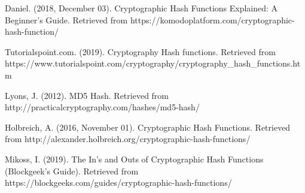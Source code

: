 \documentclass{article}
\begin{document}
\begin{thebibliography}{}
	Daniel. (2018, December 03). Cryptographic Hash Functions Explained: A Beginner's Guide. Retrieved from {https://komodoplatform.com/cryptographic-hash-function/}
	
	Tutorialspoint.com. (2019). Cryptography Hash functions. Retrieved from https://www.tutorialspoint.com/cryptography/cryptography\_hash\_functions.htm
	
	Lyons, J. (2012). MD5 Hash. Retrieved from {http://practicalcryptography.com/hashes/md5-hash/}
	
	Holbreich, A. (2016, November 01). Cryptographic Hash Functions. Retrieved from {http://alexander.holbreich.org/cryptographic-hash-functions/}	
	
	Mikoss, I. (2019). The In's and Outs of Cryptographic Hash Functions (Blockgeek's Guide).
	Retrieved from {https://blockgeeks.com/guides/cryptographic-hash-functions/}
\end{thebibliography}
\end{document}
